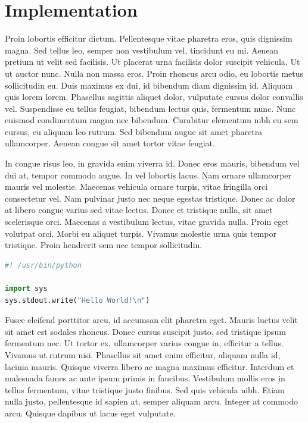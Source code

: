 \documentclass{article}
\begin{document}
\section{Implementation}

Proin lobortis efficitur dictum. Pellentesque vitae pharetra eros, quis dignissim magna. Sed tellus leo, semper non vestibulum vel, tincidunt eu mi. Aenean pretium ut velit sed facilisis. Ut placerat urna facilisis dolor suscipit vehicula. Ut ut auctor nunc. Nulla non massa eros. Proin rhoncus arcu odio, eu lobortis metus sollicitudin eu. Duis maximus ex dui, id bibendum diam dignissim id. Aliquam quis lorem lorem. Phasellus sagittis aliquet dolor, vulputate cursus dolor convallis vel. Suspendisse eu tellus feugiat, bibendum lectus quis, fermentum nunc. Nunc euismod condimentum magna nec bibendum. Curabitur elementum nibh eu sem cursus, eu aliquam leo rutrum. Sed bibendum augue sit amet pharetra ullamcorper. Aenean congue sit amet tortor vitae feugiat.

In congue risus leo, in gravida enim viverra id. Donec eros mauris, bibendum vel dui at, tempor commodo augue. In vel lobortis lacus. Nam ornare ullamcorper mauris vel molestie. Maecenas vehicula ornare turpis, vitae fringilla orci consectetur vel. Nam pulvinar justo nec neque egestas tristique. Donec ac dolor at libero congue varius sed vitae lectus. Donec et tristique nulla, sit amet scelerisque orci. Maecenas a vestibulum lectus, vitae gravida nulla. Proin eget volutpat orci. Morbi eu aliquet turpis. Vivamus molestie urna quis tempor tristique. Proin hendrerit sem nec tempor sollicitudin.

\begin{file}[hello.py]
\begin{lstlisting}[language=Python]
#! /usr/bin/python

import sys
sys.stdout.write("Hello World!\n")
\end{lstlisting}
\end{file}

Fusce eleifend porttitor arcu, id accumsan elit pharetra eget. Mauris luctus velit sit amet est sodales rhoncus. Donec cursus suscipit justo, sed tristique ipsum fermentum nec. Ut tortor ex, ullamcorper varius congue in, efficitur a tellus. Vivamus ut rutrum nisi. Phasellus sit amet enim efficitur, aliquam nulla id, lacinia mauris. Quisque viverra libero ac magna maximus efficitur. Interdum et malesuada fames ac ante ipsum primis in faucibus. Vestibulum mollis eros in tellus fermentum, vitae tristique justo finibus. Sed quis vehicula nibh. Etiam nulla justo, pellentesque id sapien at, semper aliquam arcu. Integer at commodo arcu. Quisque dapibus ut lacus eget vulputate.
\end{document}
